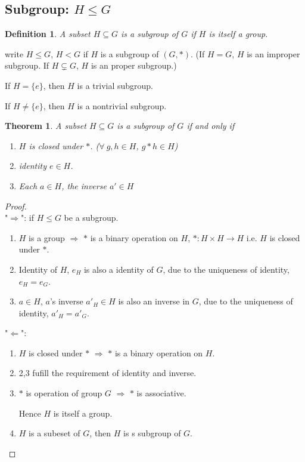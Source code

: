 \documentclass[11pt,a4paper]{article}
\newtheorem{theorem}{Theorem}
\newtheorem{definition}{Definition}
\begin{document}
\subsection{Subgroup: $H\leq G$}
\begin{definition}
A subset $H\subseteq G$ is a subgroup of $G$ if $H$ is itself a group.
\end{definition}
write $H\leq G$, $H<G$ if $H$ is a subgroup of $(G, *)$. (If $H=G$, $H$ is an improper subgroup. If $H\subsetneq G$, $H$ is an proper subgroup.)

If $H=\{e\}$, then $H$ is a trivial subgroup.

If $H\neq\{e\}$, then $H$ is a nontrivial subgroup.

\begin{theorem}
    A subset $H\subseteq G$ is a subgroup of $G$ if and only if
    \begin{enumerate}
        \item $H$ is closed under $*$. ($\forall\ g,h\in H$, $g*h\in H$)
        \item identity $e\in H$.
        \item Each $a\in H$, the inverse $a'\in H$
    \end{enumerate}
\end{theorem}
\begin{proof}
\quad\\
"$\Rightarrow$": if $H\leq G$ be a subgroup.
\begin{enumerate}
    \item $H$ is a group $\Rightarrow$ $*$ is a binary operation on $H$, $*:H\times H \rightarrow H$ i.e. $H$ is closed under $*$.
    \item Identity of $H$, $e_H$ is also a identity of $G$, due to the uniqueness of identity, $e_H=e_G$.
    \item $a\in H$, $a$'s inverse $a'_H\in H$ is also an inverse in $G$, due to the uniqueness of identity, $a'_H=a'_G$.
\end{enumerate}
"$\Leftarrow$":
\begin{enumerate}
    \item $H$ is closed under $*$ $\Rightarrow	$ $*$ is a binary operation on $H$.
    \item 2,3 fufill the requirement of identity and inverse.
    \item $*$ is operation of group $G$ $\Rightarrow$ $*$ is associative.
    
    Hence $H$ is itself a group.
    \item $H$ is a subeset of $G$, then $H$ is s subgroup of $G$.
\end{enumerate}
\end{proof}
\end{document}
